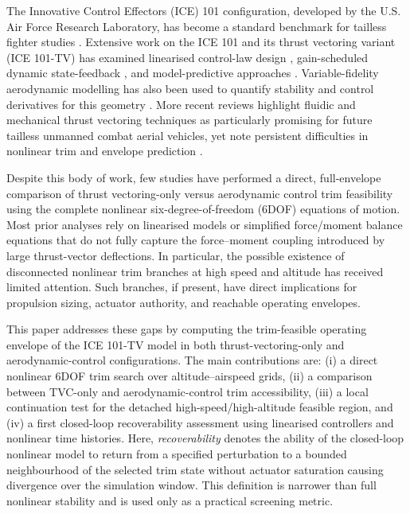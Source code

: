 \documentclass[conf]{new-aiaa}
\begin{document}
The Innovative Control Effectors (ICE) 101 configuration, developed by the U.S. Air Force Research Laboratory, has become a standard benchmark for tailless fighter studies \cite{Gillard1998}. Extensive work on the ICE 101 and its thrust vectoring variant (ICE 101-TV) has examined linearised control-law design \cite{NietoWireSobel2011}, gain-scheduled dynamic state-feedback \cite{JonesLowenbergRichardson2004}, and model-predictive approaches \cite{Proctor2019}. Variable-fidelity aerodynamic modelling has also been used to quantify stability and control derivatives for this geometry \cite{ParkChoiJo2017}. More recent reviews highlight fluidic and mechanical thrust vectoring techniques as particularly promising for future tailless unmanned combat aerial vehicles, yet note persistent difficulties in nonlinear trim and envelope prediction \cite{HuSongWu2024,LiSunTan2022}.

Despite this body of work, few studies have performed a direct, full-envelope comparison of thrust vectoring-only versus aerodynamic control trim feasibility using the complete nonlinear six-degree-of-freedom (6DOF) equations of motion. Most prior analyses rely on linearised models or simplified force/moment balance equations that do not fully capture the force--moment coupling introduced by large thrust-vector deflections. In particular, the possible existence of disconnected nonlinear trim branches at high speed and altitude has received limited attention. Such branches, if present, have direct implications for propulsion sizing, actuator authority, and reachable operating envelopes.

This paper addresses these gaps by computing the trim-feasible operating envelope of the ICE 101-TV model in both thrust-vectoring-only and aerodynamic-control configurations. The main contributions are: (i) a direct nonlinear 6DOF trim search over altitude--airspeed grids, (ii) a comparison between TVC-only and aerodynamic-control trim accessibility, (iii) a local continuation test for the detached high-speed/high-altitude feasible region, and (iv) a first closed-loop recoverability assessment using linearised controllers and nonlinear time histories. Here, \emph{recoverability} denotes the ability of the closed-loop nonlinear model to return from a specified perturbation to a bounded neighbourhood of the selected trim state without actuator saturation causing divergence over the simulation window. This definition is narrower than full nonlinear stability and is used only as a practical screening metric.
\end{document}
